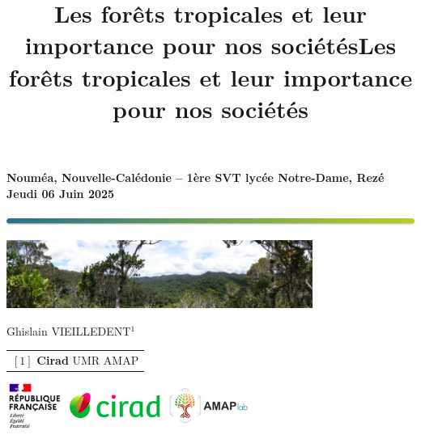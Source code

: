\documentclass[10pt,table,dvipsnames,compress]{beamer}
\date{}
\title{Les forêts tropicales et leur importance pour nos sociétés}
\title[Les forêts tropicales]{Les forêts tropicales et leur importance\\pour nos sociétés}
\begin{document}

{
  \begin{frame}
  \begin{center}
  \small{\textbf{Nouméa, Nouvelle-Calédonie -- 1ère SVT lycée Notre-Dame, Rezé\\Jeudi 06 Juin 2025}}
  \end{center}
  \vspace{-0.5cm}
  \titlepage %
  \vspace{-3cm}
  \begin{center}
    \includegraphics[width=\textwidth]{figs/Barre_couleur}
    
    \vspace{0.25cm}
    
    \includegraphics[width=10cm]{figs/Banniere}
    
    \small{Ghislain VIEILLEDENT$^{1}$}
      
    \vspace{0.25cm}
    
    {\scriptsize
      \begin{tabular}{l}
        $[1]$ \textbf{Cirad} UMR AMAP
      \end{tabular}
    }
    
    \includegraphics[width=0.6\textwidth]{figs/partners_logos}
    
  \end{center}
  \end{frame}
}

\end{document}
